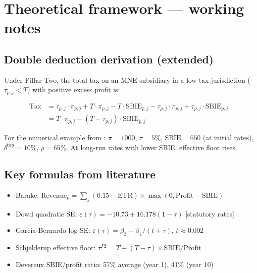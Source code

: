 \documentclass[11pt,a4paper]{article}
\begin{document}
\section{Theoretical framework --- working notes}\label{w:theory}

\subsection{Double deduction derivation (extended)}

Under Pillar Two, the total tax on an MNE subsidiary in a low-tax jurisdiction ($\tau_{p,j} < T$) with positive excess profit is:

\begin{align}
\text{Tax} &= \tau_{p,j} \cdot \pi_{p,j} + T \cdot \pi_{p,j} - T \cdot \text{SBIE}_{p,j} - \tau_{p,j} \cdot \pi_{p,j} + \tau_{p,j} \cdot \text{SBIE}_{p,j} \nonumber \\
&= T \cdot \pi_{p,j} - (T - \tau_{p,j}) \cdot \text{SBIE}_{p,j}
\end{align}

For the numerical example from \citet{schjelderup2024}: $\pi = 1000$, $\tau = 5\%$, $\text{SBIE} = 650$ (at initial rates), $\delta^{\text{top}} = 10\%$, $\rho = 65\%$. At long-run rates with lower SBIE: effective floor rises.

\subsection{Key formulas from literature}

\begin{itemize}
\item Barake: $\text{Revenue}_p = \sum_j (0.15 - \text{ETR}) \times \max(0, \text{Profit} - \text{SBIE})$
\item Dowd quadratic SE: $\varepsilon(\tau) = -10.73 + 16.178(1-\tau)$ [statutory rates]
\item Garcia-Bernardo log SE: $\varepsilon(\tau) = \beta_3 + \beta_4/(t+\tau)$, $t \approx 0.002$
\item Schjelderup effective floor: $\tau^{P2} = T - (T-\tau) \times \text{SBIE}/\text{Profit}$
\item Devereux SBIE/profit ratio: 57\% average (year 1), 41\% (year 10)
\end{itemize}
\end{document}

